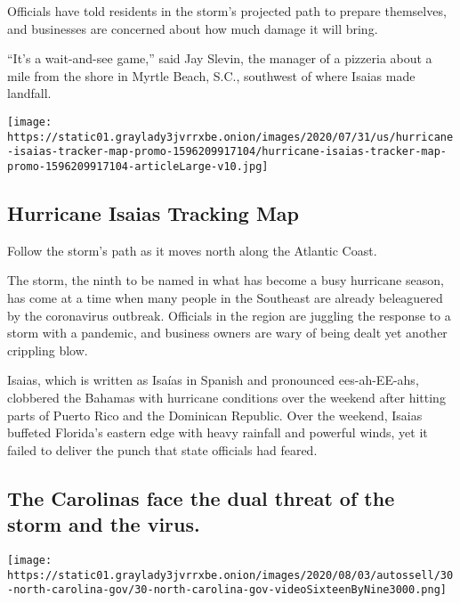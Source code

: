Officials have told residents in the storm's projected path to prepare
themselves, and businesses are concerned about how much damage it will
bring.

``It's a wait-and-see game,'' said Jay Slevin, the manager of a pizzeria
about a mile from the shore in Myrtle Beach, S.C., southwest of where
Isaias made landfall.

\href{https://www.nytimes3xbfgragh.onion/interactive/2020/07/31/us/hurricane-isaias-tracker-map.html}{}

\texttt{[image: https://static01.graylady3jvrrxbe.onion/images/2020/07/31/us/hurricane-isaias-tracker-map-promo-1596209917104/hurricane-isaias-tracker-map-promo-1596209917104-articleLarge-v10.jpg]}

\hypertarget{hurricane-isaias-tracking-map}{%
\subsection{Hurricane Isaias Tracking
Map}\label{hurricane-isaias-tracking-map}}

Follow the storm's path as it moves north along the Atlantic Coast.

The storm, the ninth to be named in what has become a busy hurricane
season, has come at a time when many people in the Southeast are already
beleaguered by the coronavirus outbreak. Officials in the region are
juggling the response to a storm with a pandemic, and business owners
are wary of being dealt yet another crippling blow.

Isaias, which is written as Isaías in Spanish and pronounced
ees-ah-EE-ahs, clobbered the Bahamas with hurricane conditions over the
weekend after hitting parts of Puerto Rico and the Dominican Republic.
Over the weekend, Isaias buffeted Florida's eastern edge with heavy
rainfall and powerful winds, yet it failed to deliver the punch that
state officials had feared.

\hypertarget{the-carolinas-face-the-dual-threat-of-the-storm-and-the-virus}{%
\subsection{The Carolinas face the dual threat of the storm and the
virus.}\label{the-carolinas-face-the-dual-threat-of-the-storm-and-the-virus}}

\texttt{[image: https://static01.graylady3jvrrxbe.onion/images/2020/08/03/autossell/30-north-carolina-gov/30-north-carolina-gov-videoSixteenByNine3000.png]}


